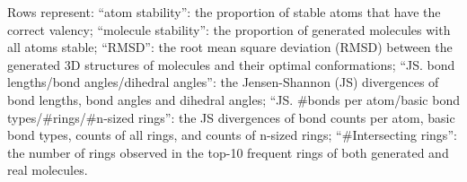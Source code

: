 \begin{table*}[!h]
\begin{scriptsize}
\begin{threeparttable}
\begin{tabular}
		\bottomrule
	\end{tabular}%
	\begin{tablenotes}
		\begin{footnotesize}
	\item 
\!\!Rows represent:  {``atom stability'': the proportion of stable atoms that have the correct valency; 
		``molecule stability'': the proportion of generated molecules with all atoms stable;
		``RMSD'': the root mean square deviation (RMSD) between the generated 3D structures of molecules and their optimal conformations; %
		``JS. bond lengths/bond angles/dihedral angles'': the Jensen-Shannon (JS) divergences of bond lengths, bond angles and dihedral angles;
		``JS. \#bonds per atom/basic bond types/\#rings/\#n-sized rings'': the JS divergences of bond counts per atom, basic bond types, counts of all rings, and counts of n-sized rings;
		``\#Intersecting rings'': the number of rings observed in the top-10 frequent rings of both generated and real molecules. } \par
		\par
		\end{footnotesize}
	\end{tablenotes}
\end{threeparttable}
\end{scriptsize}
\end{table*}
